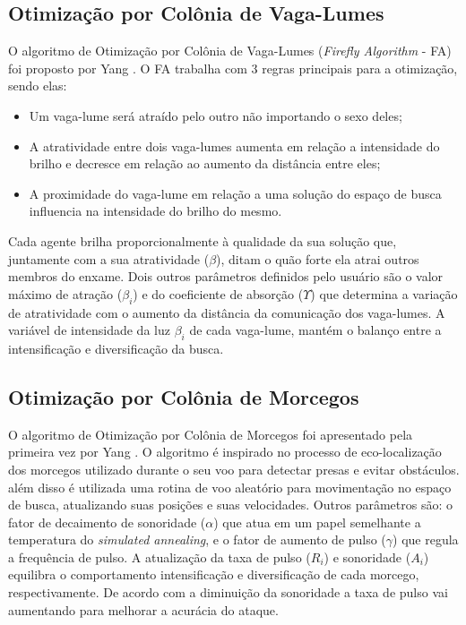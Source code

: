 \subsection{Otimização por Colônia de Vaga-Lumes}
\label{sec:firefly_algorithm}
O algoritmo de Otimização por Colônia de Vaga-Lumes (\textit{Firefly Algorithm} - FA) foi proposto por Yang \cite{firefly}. O FA trabalha com 3 regras principais para a otimização, sendo elas:

\begin{itemize}
\item Um vaga-lume será atraído pelo outro não importando o sexo deles;

\item A atratividade entre dois vaga-lumes aumenta em relação a intensidade do brilho e decresce em relação ao aumento da distância entre eles;

\item A proximidade do vaga-lume em relação a uma solução do espaço de busca influencia na intensidade do brilho do mesmo.
\end{itemize}

Cada agente brilha proporcionalmente à qualidade da sua solução que, juntamente com a sua atratividade ($\beta$), ditam o quão forte ela atrai outros membros do enxame. Dois outros parâmetros definidos pelo usuário são o valor máximo de atração ($\beta_i$) e do coeficiente de absorção ($\Upsilon$) que determina a variação de atratividade com o aumento da distância da comunicação dos vaga-lumes. A variável
de intensidade da luz $\beta_i$ de cada vaga-lume, mantém o balanço entre a intensificação e diversificação da busca.

\subsection{Otimização por Colônia de Morcegos}
\label{sec:bat_algorithm}
O algoritmo de Otimização por Colônia de Morcegos foi apresentado pela primeira vez por Yang \cite{bat}. O algoritmo é inspirado no processo de eco-localização dos morcegos utilizado durante o seu voo para detectar presas e evitar obstáculos. além disso é utilizada uma rotina de voo aleatório para movimentação no espaço de busca, atualizando suas posições e suas velocidades. Outros parâmetros são: o fator de decaimento de sonoridade ($\alpha$) que atua em um papel semelhante a temperatura do \textit{simulated annealing}, e o fator de aumento de pulso ($\gamma$) que regula a frequência de pulso. A atualização da taxa de pulso ($R_i$) e sonoridade ($A_i$) equilibra o comportamento intensificação e diversificação de cada morcego, respectivamente. De acordo com a diminuição da sonoridade a taxa de pulso vai aumentando para melhorar a acurácia do ataque. 

